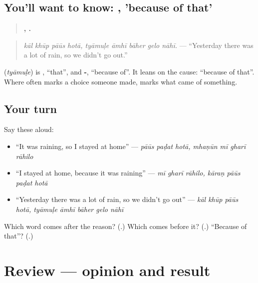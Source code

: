 \subsection*{You'll want to know: , 'because of that'}
\begin{quote}
\textbf{   ,     .}
\end{quote}

\begin{quote}
\emph{kāl khūp pāūs hotā, tyāmuḷe āmhī bāher gelo nāhī.} — \textquotedblleft{}Yesterday there was a lot of rain, so we didn't go out.\textquotedblright{}
\end{quote}

\textbf{} (\emph{tyāmuḷe}) is \textbf{}, \textquotedblleft{}that\textquotedblright{}, and \textbf{-}, \textquotedblleft{}because of\textquotedblright{}. It leans on the cause: \textquotedblleft{}because of that\textquotedblright{}. Where \textbf{} often marks a choice someone made, \textbf{} marks what came of something.

\subsection*{Your turn}
Say these aloud:

\begin{itemize}
\raggedright
  \item \textquotedblleft{}It was raining, so I stayed at home\textquotedblright{} — \emph{pāūs paḍat hotā, mhaṇūn mī gharī rāhilo}
  \item \textquotedblleft{}I stayed at home, because it was raining\textquotedblright{} — \emph{mī gharī rāhilo, kāraṇ pāūs paḍat hotā}
  \item \textquotedblleft{}Yesterday there was a lot of rain, so we didn't go out\textquotedblright{} — \emph{kāl khūp pāūs hotā, tyāmuḷe āmhī bāher gelo nāhī}
\end{itemize}

\begin{tcolorbox}[breakable,colback=teal!4,colframe=teal!35!black,title={Before you move on}]
Which word comes after the reason? (\textbf{}.) Which comes before it? (\textbf{}.) \textquotedblleft{}Because of that\textquotedblright{}? (\textbf{}.)
\end{tcolorbox}
\section[(review)]{Review — opinion and result}

